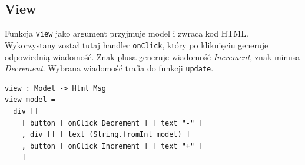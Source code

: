 \documentclass[twoside,a4paper]{report}
\begin{document}
\subsection{View}
Funkcja \texttt{view} jako argument przyjmuje model i zwraca kod HTML\@.
Wykorzystany został tutaj handler \texttt{onClick}, który po kliknięciu generuje odpowiednią wiadomość.
Znak plusa generuje wiadomość \textit{Increment}, znak minusa \textit{Decrement}.
Wybrana wiadomość trafia do funkcji \texttt{update}.

\lstset{frame=single}
\begin{lstlisting}[caption={\textit{The Elm Architecture} - View},label=kod:View]
view : Model -> Html Msg
view model =
  div []
    [ button [ onClick Decrement ] [ text "-" ]
    , div [] [ text (String.fromInt model) ]
    , button [ onClick Increment ] [ text "+" ]
    ]
\end{lstlisting}
\lstset{frame=none}
\end{document}
